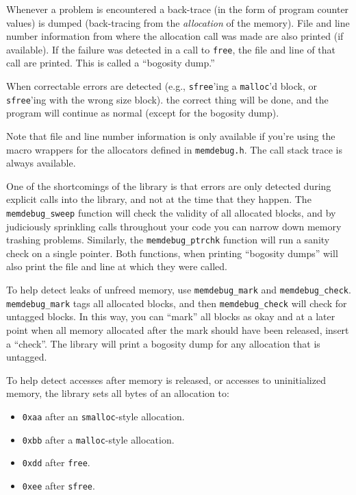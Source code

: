 Whenever a problem is encountered a back-trace (in the form of 
program counter
values) is dumped (back-tracing from the \emph{allocation} of the
memory).  File and line number information from where the allocation
call was made are also printed (if available).  If the failure was
detected in a call to \texttt{free}, the file and line of that call are
printed.  This is called a ``bogosity dump.''

When correctable errors are detected (e.g., 
{\tt sfree}'ing a {\tt malloc}'d block,
or {\tt sfree}'ing with the wrong size block). 
the correct thing will be
done, and the program will continue as normal (except for the
bogosity dump).

Note that file and line number information is only available if
you're using the macro wrappers for the allocators defined in
{\tt memdebug.h}.  The call stack trace is always
available.

One of the shortcomings of the library is that errors are only
detected during explicit calls into the library, and not at the time
that they happen.  The {\tt memdebug_sweep} function will check the
validity of all allocated blocks, and by judiciously sprinkling calls
throughout your code you can narrow down memory trashing problems.
Similarly, the {\tt memdebug_ptrchk} function will run a sanity
check on a single pointer.  Both functions, when printing ``bogosity
dumps'' will also print the file and line at which they were called.

To help detect leaks of unfreed memory, use {\tt memdebug_mark} and 
{\tt memdebug_check}.
{\tt memdebug_mark} tags all allocated blocks, and then 
{\tt memdebug_check} will check for untagged blocks.  In 
this way, you can ``mark'' all blocks as okay 
and at a later point when
all memory allocated after the mark should have been released,
insert a ``check''.  
The library will print a bogosity dump for any allocation
that is untagged.

To help detect accesses after memory is released, or accesses to
uninitialized memory, the library sets all bytes of an allocation to:
\begin{itemize}
\item{\tt 0xaa} after an {\tt smalloc}-style allocation.
\item{\tt 0xbb} after a {\tt malloc}-style allocation.
\item{\tt 0xdd} after {\tt free}.
\item{\tt 0xee} after {\tt sfree}.
\end{itemize}


